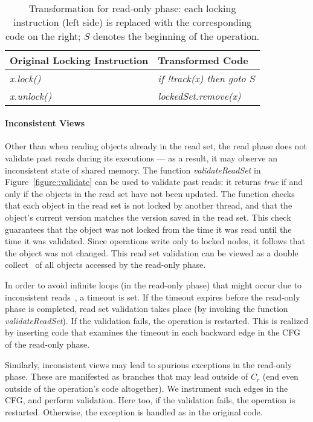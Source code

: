 \begin{table}
\scriptsize
\ttfamily
{\tt
\begin{center}
\begin{tabular}{|l|l|}
\hline
\textbf{Original Locking Instruction} & \textbf{Transformed Code}\\
\hline
\textit{x.lock()}&
\textit{if !track(x) then goto $S$}
\\
\hline
\textit{x.unlock()}&
\textit{lockedSet.remove(x)}
\\
\hline
\end{tabular}
\end{center}
}
\caption{Transformation for read-only phase:
each locking instruction (left side) is replaced with the corresponding code on the right;
 $S$  denotes the beginning of the operation.
}
\label{Ta:readOnlyTransformation}
\end{table}

\paragraph{Inconsistent Views}
Other than when reading objects already in the read set, the read phase does not validate past reads during its executions ---
as a result, it may observe an inconsistent state of shared memory.
%
The function \emph{validateReadSet} in Figure~\ref{figure::validate} can be used to validate past reads: it returns \emph{true} if and only if the objects in the read set have not been updated.
%
The function checks that each object in the read set is not locked by another thread,
and that the object's current version matches the version saved in the
read set.
This check guarantees that the object was not locked from the time it was read until
the time it was validated.
Since operations write only to
locked nodes, it follows that the object was not changed.
This read set validation can be viewed as a double collect~\cite{Afek:1993:ASS:153724.153741}
of all objects accessed by the read-only phase.

In order to avoid infinite loops (in the read-only phase) that might occur due to inconsistent reads~\cite{xxx}, a timeout is set.
If the timeout expires before the read-only phase is completed, read set
validation takes place (by invoking the function \emph{validateReadSet}). If the validation fails, the operation is restarted.
This is realized by inserting code that examines the timeout in each backward edge in the CFG of the read-only phase.

Similarly, inconsistent views may lead to spurious exceptions in the read-only phase. These are manifested as branches that 
may lead outside of $C_r$ (end even outside of the operation's code altogether). We instrument such edges in the CFG, and 
perform validation. Here too, if the validation fails, the operation is restarted. Otherwise, the exception is handled as in 
the original code.



